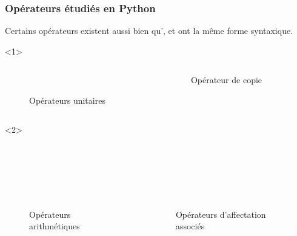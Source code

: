 \documentclass{cppcourses}
\begin{document}
\begin{frame}

\frametitle{Opérateurs étudiés en Python}

Certains opérateurs existent  aussi bien qu', et ont la même forme syntaxique.

\begin{onlyenv}<1>

\begin{columns}
    \begin{column}{0.5\textwidth}
        \begin{figure}
 \\
\caption{Opérateurs unitaires}
        \end{figure}
    \end{column}
    \begin{column}{0.5\textwidth}
        \begin{figure}
\caption{Opérateur de copie}
        \end{figure}
    \end{column}
\end{columns}

\end{onlyenv}

\begin{onlyenv}<2>

\begin{columns}
    \begin{column}{0.5\textwidth}
        \begin{figure}
 \\
 \\
 \\
 \\
\caption{Opérateurs arithmétiques}
        \end{figure}
    \end{column}
    \begin{column}{0.5\textwidth}
        \begin{figure}
 \\
 \\
 \\
 \\
\caption{Opérateurs d'affectation associés}
        \end{figure}
    \end{column}
\end{columns}


\end{onlyenv}
\end{frame}
\end{document}
